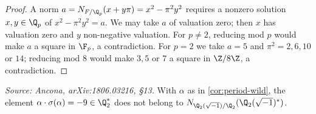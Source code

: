 \begin{proof}
  A norm \(a = N_{F/\Q_p}(x + y\pi) = x^2 - \pi^2 y^2\) requires a nonzero
  solution \(x, y \in \Q_p\) of \(x^2 - \pi^2 y^2 = a\). We may take \(a\) of
  valuation zero; then \(x\) has valuation zero and \(y\) non-negative
  valuation. For \(p \neq 2\), reducing mod \(p\) would make \(a\) a square in
  \(\F_p\), a contradiction. For \(p = 2\) we take \(a = 5\) and \(\pi^2 = 2, 6,
  10\) or \(14\); reducing mod \(8\) would make \(3, 5\) or \(7\) a square in
  \(\Z/8\Z\), a contradiction.
\end{proof}

\begin{lemma}[\(-9\) is not a norm, \(F = \Q_2(\sqrt{-1})\)]
  \label{lem:not-norm-wild}
  \textit{Source: Ancona, arXiv:1806.03216, \S13.}
  With \(\alpha\) as in \cref{cor:period-wild}, the element
  \(\alpha \cdot \sigma(\alpha) = -9 \in \Q_2^*\) does not belong to
  \(N_{\Q_2(\sqrt{-1})/\Q_2}(\Q_2(\sqrt{-1})^*)\).
\end{lemma}

